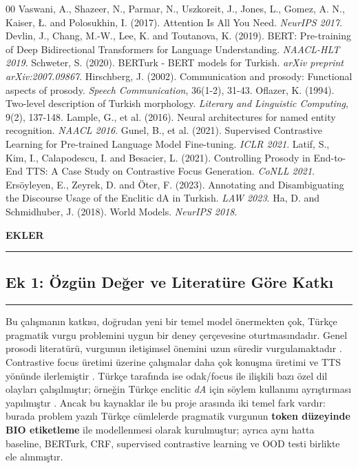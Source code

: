 \documentclass[conference]{IEEEtran}
\begin{document}
\begin{thebibliography}{00}
 Vaswani, A., Shazeer, N., Parmar, N., Uszkoreit, J., Jones, L., Gomez, A. N., Kaiser, {\L}. and Polosukhin, I. (2017). Attention Is All You Need. \textit{NeurIPS 2017}.
 Devlin, J., Chang, M.-W., Lee, K. and Toutanova, K. (2019). BERT: Pre-training of Deep Bidirectional Transformers for Language Understanding. \textit{NAACL-HLT 2019}.
 Schweter, S. (2020). BERTurk - BERT models for Turkish. \textit{arXiv preprint arXiv:2007.09867}.
 Hirschberg, J. (2002). Communication and prosody: Functional aspects of prosody. \textit{Speech Communication}, 36(1-2), 31-43.
 Oflazer, K. (1994). Two-level description of Turkish morphology. \textit{Literary and Linguistic Computing}, 9(2), 137-148.
 Lample, G., et al. (2016). Neural architectures for named entity recognition. \textit{NAACL 2016}.
 Gunel, B., et al. (2021). Supervised Contrastive Learning for Pre-trained Language Model Fine-tuning. \textit{ICLR 2021}.
 Latif, S., Kim, I., Calapodescu, I. and Besacier, L. (2021). Controlling Prosody in End-to-End TTS: A Case Study on Contrastive Focus Generation. \textit{CoNLL 2021}.
 Ers\"oyleyen, E., Zeyrek, D. and \"Oter, F. (2023). Annotating and Disambiguating the Discourse Usage of the Enclitic dA in Turkish. \textit{LAW 2023}.
 Ha, D. and Schmidhuber, J. (2018). World Models. \textit{NeurIPS 2018}.
\end{thebibliography}

\newpage
\onecolumn

\begin{center}
\textbf{\LARGE EKLER}
\end{center}

\vspace{0.8cm}

\noindent\rule{\textwidth}{1pt}
\subsection*{\Large Ek 1: Özgün Değer ve Literatüre Göre Katkı}
\noindent\rule{\textwidth}{0.5pt}

Bu çalışmanın katkısı, doğrudan yeni bir temel model önermekten çok, Türkçe pragmatik vurgu problemini uygun bir deney çerçevesine oturtmasındadır. Genel prosodi literatürü, vurgunun iletişimsel önemini uzun süredir vurgulamaktadır \cite{prosody1}. Contrastive focus üretimi üzerine çalışmalar daha çok konuşma üretimi ve TTS yönünde ilerlemiştir \cite{latif2021}. Türkçe tarafında ise odak/focus ile ilişkili bazı özel dil olayları çalışılmıştır; örneğin Türkçe enclitic \textit{dA} için söylem kullanımı ayrıştırması yapılmıştır \cite{ersoyleyen2023}. Ancak bu kaynaklar ile bu proje arasında iki temel fark vardır: burada problem yazılı Türkçe cümlelerde pragmatik vurgunun \textbf{token düzeyinde BIO etiketleme} ile modellenmesi olarak kurulmuştur; ayrıca aynı hatta baseline, BERTurk, CRF, supervised contrastive learning ve OOD testi birlikte ele alınmıştır.
\end{document}
